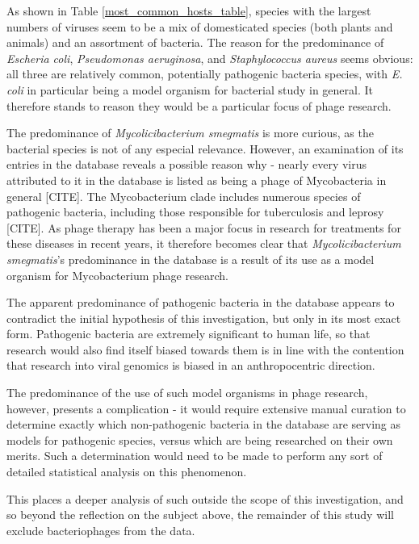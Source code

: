 \documentclass[12pt]{article}
\begin{document}
    As shown in Table \ref{most_common_hosts_table}, species with the largest
    numbers of viruses seem to be a mix of domesticated species (both plants
    and animals) and an assortment of bacteria. The reason for the predominance of
    \emph{Escheria coli}, \emph{Pseudomonas aeruginosa}, and \emph{Staphylococcus
    aureus} seems obvious: all three are relatively common, potentially pathogenic
    bacteria species, with \emph{E. coli} in particular being a model organism for
    bacterial study in general. It therefore stands to reason they would be a
    particular focus of phage research.

    The predominance of \emph{Mycolicibacterium smegmatis} is more curious, as the
    bacterial species is not of any especial relevance. However, an examination of 
    its entries in the database reveals a possible reason why - nearly every virus
    attributed to it in the database is listed as being a phage of Mycobacteria in
    general [CITE]. The Mycobacterium clade includes numerous species of pathogenic
    bacteria, including those responsible for tuberculosis and leprosy [CITE]. As 
    phage therapy has been a major focus in research for treatments for these
    diseases in recent years, it therefore becomes clear that
    \emph{Mycolicibacterium smegmatis}'s predominance in the database is a result
    of its use as a model organism for Mycobacterium phage research.
    
    The apparent predominance of pathogenic bacteria in the database appears
    to contradict the initial hypothesis of this investigation, but only in its
    most exact form. Pathogenic bacteria are extremely significant to human life,
    so that research would also find itself biased towards them is in line with
    the contention that research into viral genomics is biased in an
    anthropocentric direction.

    The predominance of the use of such model organisms in phage research,
    however, presents a complication - it would require extensive manual curation
    to determine exactly which non-pathogenic bacteria in the database are serving
    as models for pathogenic species, versus which are being researched on their
    own merits. Such a determination would need to be made to perform any sort of
    detailed statistical analysis on this phenomenon.

    This places a deeper analysis of such outside the scope of this
    investigation, and so beyond the reflection on the subject above, the remainder
    of this study will exclude bacteriophages from the data.
\end{document}
